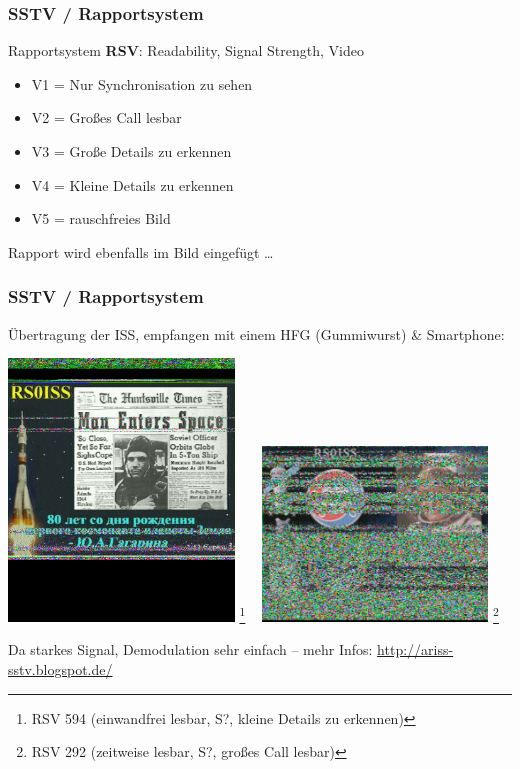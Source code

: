 \begin{frame}
    \frametitle{SSTV / Rapportsystem}
   

    Rapportsystem \textbf{RSV}\hyperlink{refs}{\cite{bv12}}: Readability, Signal Strength, Video

    \begin{itemize}
        \item V1 = Nur Synchronisation zu sehen
        \item V2 = Großes Call lesbar
        \item V3 = Große Details zu erkennen
        \item V4 = Kleine Details zu erkennen
        \item V5 = rauschfreies Bild
    \end{itemize}

    \bigskip

    Rapport wird ebenfalls im Bild eingefügt \dots

\end{frame}

\begin{frame}
    \frametitle{SSTV / Rapportsystem}

    Übertragung der ISS, empfangen mit einem HFG (Gummiwurst) \& Smartphone:

    \begin{center}
        \includegraphics[width=0.45\textwidth,height=.45\textheight,keepaspectratio]{e16/SSTV-RS0ISS.jpg}
        \footnote{RSV 594 (einwandfrei lesbar, S?, kleine Details zu erkennen)}
        ~
        \includegraphics[width=0.45\textwidth,height=.45\textheight,keepaspectratio]{e16/SSTV-RS0ISS_2015-07-19.jpg}
        \footnote{RSV 292 (zeitweise lesbar, S?, großes Call lesbar)}
    \end{center}

    Da starkes Signal, Demodulation sehr einfach -- mehr Infos: \url{http://ariss-sstv.blogspot.de/}

\end{frame}

